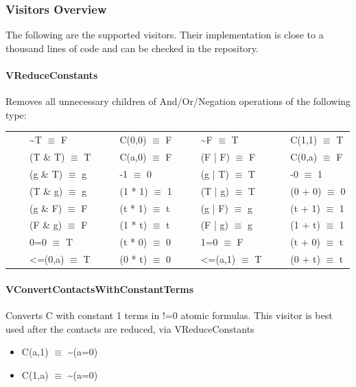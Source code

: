 \documentclass{article}
\newcommand{\tabitem}{~~\llap{\textbullet}~~}
\begin{document}
	\subsubsection{Visitors Overview}
	The following are the supported visitors. Their implementation is close to a thousand lines of code and can be checked in the repository.
	\paragraph{VReduceConstants}
	Removes all unnecessary children of And/Or/Negation operations of the following type:
			\begin{table}[H]
				  \centering
				  \begin{tabular}{llll}
				    \toprule
				    \midrule
				\tabitem \textasciitilde T $\equiv$ F & \tabitem C(0,0)  $\equiv$ F & \tabitem \textasciitilde F $\equiv$ T & \tabitem C(1,1) $\equiv$ T \\
				\tabitem (T \& T) $\equiv$ T & \tabitem C(a,0)  $\equiv$ F & \tabitem (F | F) $\equiv$ F & \tabitem C(0,a) $\equiv$ F \\
				\tabitem (g \& T) $\equiv$ g & \tabitem -1 $\equiv$ 0 & \tabitem (g | T) $\equiv$ T & \tabitem -0 $\equiv$ 1 \\
				\tabitem (T \& g) $\equiv$ g & \tabitem (1 * 1) $\equiv$ 1 & \tabitem (T | g) $\equiv$ T & \tabitem (0 + 0) $\equiv$ 0 \\
				\tabitem (g \& F) $\equiv$ F & \tabitem (t * 1) $\equiv$ t & \tabitem (g | F) $\equiv$ g & \tabitem (t + 1) $\equiv$ 1 \\
				\tabitem (F \& g) $\equiv$ F & \tabitem (1 * t) $\equiv$ t & \tabitem (F | g) $\equiv$ g & \tabitem (1 + t) $\equiv$ 1 \\
				\tabitem 0=0 $\equiv$ T & \tabitem (t * 0) $\equiv$ 0 & \tabitem 1=0 $\equiv$ F & \tabitem (t + 0) $\equiv$ t \\
				\tabitem <=(0,a) $\equiv$ T & \tabitem (0 * t) $\equiv$ 0 & \tabitem <=(a,1) $\equiv$ T & \tabitem (0 + t) $\equiv$ t \\

					    \bottomrule
				  \end{tabular}
				\end{table}

	\paragraph{VConvertContactsWithConstantTerms}
				Converts C with constant 1 terms in !=0 atomic formulas.
				This visitor is best used after the contacts are reduced, via VReduceConstants
				\begin{itemize}
					\item C(a,1) $\equiv$ \textasciitilde(a=0)
					\item C(1,a) $\equiv$ \textasciitilde(a=0)
				\end{itemize}
\end{document}
